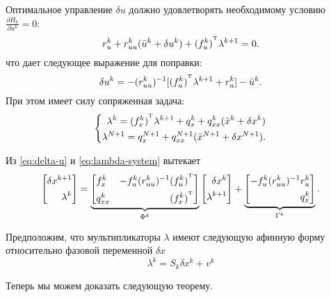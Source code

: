 Оптимальное управление $\delta u$ должно удовлетворять необходимому условию $\frac{\partial H_k}{\partial u^k} = 0$:
\begin{equation*}
    r_u^k + r_{uu}^k(\bar u^k + \delta u^k) + (f_u^k)^{^\mathrm{T}}\lambda^{k+1} = 0.
\end{equation*}
что дает следующее выражение для поправки:
\begin{equation}\label{eq:delta-u}
    \delta u^k = - (r_{uu}^k)^{-1}[(f_u^k)^{^\mathrm{T}}\lambda^{k+1} + r_u^k] - \bar u^k.
\end{equation}
При этом имеет силу сопряженная задача:
\begin{equation}\label{eq:lambda-system}
    \left\{\begin{aligned}
        \lambda^k = (f_x^k)^{^\mathrm{T}} \lambda^{k+1} + q_x^k + q_{xx}^k(\bar x^k + \delta x^k)
        \\
        \lambda^{N+1} = q_x^{N+1} + q_{xx}^{N+1}(\bar x^{N+1} + \delta x^{N+1})
        .
    \end{aligned}\right.
\end{equation}

Из \eqref{eq:delta-u} и \eqref{eq:lambda-system} вытекает
\begin{equation}
    \left[\begin{aligned}
        \delta x^{k+1}
        \\
        \lambda^{k}
    \end{aligned}\right]
    =
    \underbrace{\left[\begin{aligned}
        & f_x^k & -f^k_u (r^k_{uu})^{-1} (f^k_u)^{^\mathrm{T}} &
        \\
        & q^k_{xx} & (f^k_x)^{^\mathrm{T}} &
    \end{aligned}\right]}_{\Phi^k}
    \left[\begin{aligned}
        \delta x^k
        \\
        \lambda^{k+1}
    \end{aligned}\right]
    +
    \underbrace{\left[\begin{aligned}
        -f^k_u (r^k_{uu})^{-1} r^k_u
        \\
        q^k_x
    \end{aligned}\right]}_{\Gamma^k}.
\end{equation}

Предположим, что мультипликаторы $\lambda$ имеют следующую афинную форму относительно фазовой переменной $\delta x$
$$
    \lambda^{k} = S_k \delta x^k + v^k
$$

Теперь мы можем доказать следующую теорему.

